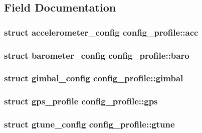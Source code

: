 \subsection{Field Documentation}
\hypertarget{structconfig__profile_ad62236bbaf62a6059204c64bae21e79b}{
\subsubsection[{acc}]{\setlength{\rightskip}{0pt plus 5cm}struct {\bf accelerometer\+\_\+config} config\+\_\+profile\+::acc}}\label{structconfig__profile_ad62236bbaf62a6059204c64bae21e79b}
\hypertarget{structconfig__profile_a1d5ba292d5e9d3cda5017c87cefc9371}{
\subsubsection[{baro}]{\setlength{\rightskip}{0pt plus 5cm}struct {\bf barometer\+\_\+config} config\+\_\+profile\+::baro}}\label{structconfig__profile_a1d5ba292d5e9d3cda5017c87cefc9371}
\hypertarget{structconfig__profile_a1f93f192a762277a14f8b009f6578703}{
\subsubsection[{gimbal}]{\setlength{\rightskip}{0pt plus 5cm}struct {\bf gimbal\+\_\+config} config\+\_\+profile\+::gimbal}}\label{structconfig__profile_a1f93f192a762277a14f8b009f6578703}
\hypertarget{structconfig__profile_a8eb78c3f11b2c30d907908ba7a2b722e}{
\subsubsection[{gps}]{\setlength{\rightskip}{0pt plus 5cm}struct {\bf gps\+\_\+profile} config\+\_\+profile\+::gps}}\label{structconfig__profile_a8eb78c3f11b2c30d907908ba7a2b722e}
\hypertarget{structconfig__profile_aaf5e741ea89faecbada743f2166e819f}{
\subsubsection[{gtune}]{\setlength{\rightskip}{0pt plus 5cm}struct {\bf gtune\+\_\+config} config\+\_\+profile\+::gtune}}\label{structconfig__profile_aaf5e741ea89faecbada743f2166e819f}
